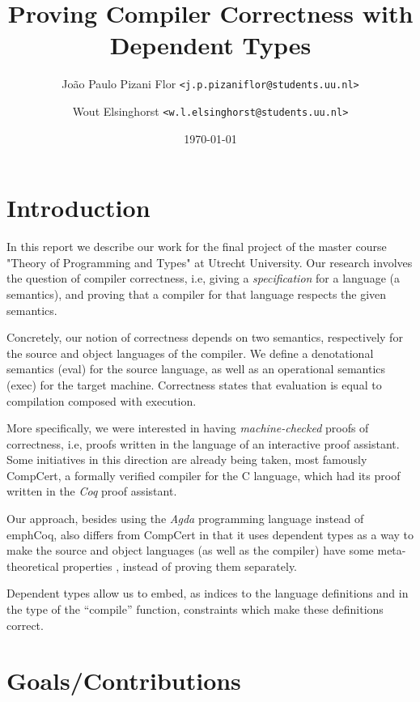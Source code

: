 \documentclass[a4paper]{article}
\title{Proving Compiler Correctness with Dependent Types}
\date{\today}
\author {
    João Paulo Pizani Flor \texttt{<j.p.pizaniflor@students.uu.nl>} \\
    \and Wout Elsinghorst \texttt{<w.l.elsinghorst@students.uu.nl>} \\
}
\begin{document}
    \maketitle

    \section{Introduction}
    \label{sec:intro}
        In this report we describe our work for the final project of the master course
        "Theory of Programming and Types" at Utrecht University. Our research involves
        the question of compiler correctness, i.e, giving a \emph{specification} for
        a language (a semantics), and proving that a compiler for that language respects
        the given semantics.

        Concretely, our notion of correctness depends on two semantics, respectively for the source
        and object languages of the compiler. We define a denotational semantics (eval) for the source
        language, as well as an operational semantics (exec) for the target machine. Correctness
        states that evaluation is equal to compilation composed with execution.

        More specifically, we were interested in having \emph{machine-checked} proofs of correctness,
        i.e, proofs written in the language of an interactive proof assistant. Some initiatives in
        this direction are already being taken, most famously CompCert, a formally verified compiler
        for the C language, which had its proof written in the \emph{Coq} proof assistant.

        Our approach, besides using the \emph{Agda} programming language instead of emph{Coq},
        also differs from CompCert in that it uses dependent types as a way to make the
        source and object languages (as well as the compiler) have some meta-theoretical properties
        , instead of proving them separately.

        Dependent types allow us to embed, as indices to the language definitions and in the type
        of the ``compile'' function, constraints which make these definitions correct. %


    \section{Goals/Contributions}
    \label{sec:goals}
\end{document}
